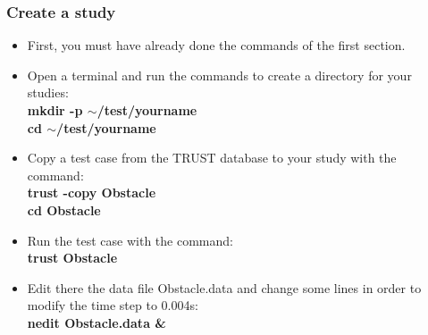 \documentclass[10pt]{beamer}
\begin{document}
\begin{frame}
\frametitle{Create a study}
\begin{block}{}

\begin{itemize}
\item First, you must have already done the commands of the first section.
\vspace{0.2cm}

\item Open a terminal and run the commands to create a directory for your studies: \\
\textbf{mkdir -p \; $\sim$/test/yourname}\\
\textbf{cd \; $\sim$/test/yourname}
\vspace{0.2cm}

\item \label{method_copy} Copy a test case from the TRUST database to your study with the command:\\
\textbf{trust -copy Obstacle}\\
\textbf{cd Obstacle}
\vspace{0.2cm}

\item Run the test case with the command:\\
\textbf{trust Obstacle}\\
\vspace{0.2cm}

\item Edit there the data file Obstacle.data and change some lines in order to modify the time step to 0.004s:\\
\textbf{nedit Obstacle.data \&}\\
\end{itemize}

\end{block}
\end{frame}
\end{document}
